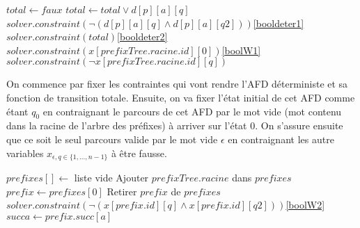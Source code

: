 \documentclass[12pt,a4paper,oneside,titlepage]{report}
\begin{document}
\begin{algorithm}[H]
\begin{algorithmic}[1]
		\State $total\gets faux$
			\State $total\gets total\lor d[p][a][q]$
				\State $solver.constraint(\neg(d[p][a][q]\land d[p][a][q2]))$\Comment \ref{booldeter1}
			\EndFor
		\EndFor
		\State $solver.constraint(total)$\Comment \ref{booldeter2}
	\EndFor
\EndFor
\State $solver.constraint(x[prefixTree.racine.id][0])$\Comment \ref{boolW1}
	\State $solver.constraint(\neg x[prefixTree.racine.id][q])$
\EndFor
{}
\end{algorithmic}
\end{algorithm}
\noindent On commence par fixer les contraintes qui vont rendre l'AFD déterministe et sa fonction de transition totale. Ensuite, on va fixer l'état initial de cet AFD comme étant $q_0$ en contraignant le parcours de cet AFD par le mot vide (mot contenu dans la racine de l'arbre des préfixes) à arriver sur l'état $0$. On s'assure ensuite que ce soit le seul parcours valide par le mot vide $\epsilon$ en contraignant les autre variables $x_{\epsilon,q\in\{1,...,n-1\}}$ à être fausse.

\begin{algorithm}[H]
\begin{algorithmic}[1]
\State $prefixes[]\gets$ liste vide
\State Ajouter $prefixTree.racine$ dans $prefixes$
	\State $prefix\gets prefixes[0]$
	\State Retirer $prefix$ de $prefixes$
			\State $solver.constraint(\neg(x[prefix.id][q]\land x[prefix.id][q2]))$\Comment \ref{boolW2}
		\EndFor
	\EndFor
			\State $succa\gets prefix.succ[a]$
\end{algorithmic}
\end{algorithm}
\end{document}
